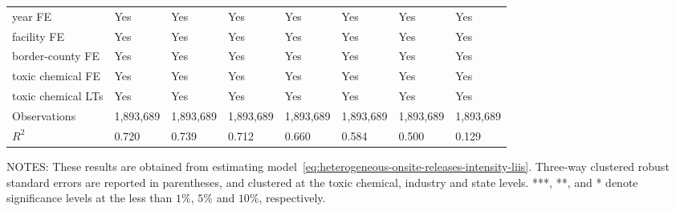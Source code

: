 \begin{table}[H]
{\begin{tabular}{@{}llllllll@{}}
            year FE                               & Yes       & Yes           & Yes       & Yes          & Yes             & Yes           & Yes                 \\
            facility FE                           & Yes       & Yes           & Yes       & Yes          & Yes             & Yes           & Yes                 \\
            border-county FE                      & Yes       & Yes           & Yes       & Yes          & Yes             & Yes           & Yes                 \\
            toxic chemical FE                     & Yes       & Yes           & Yes       & Yes          & Yes             & Yes           & Yes                 \\
            toxic chemical LTs                    & Yes       & Yes           & Yes       & Yes          & Yes             & Yes           & Yes                 \\ \midrule
            Observations                          & 1,893,689 & 1,893,689     & 1,893,689 & 1,893,689    & 1,893,689       & 1,893,689     & 1,893,689           \\
            $R^2$                                 & 0.720     & 0.739         & 0.712     & 0.660        & 0.584           & 0.500         & 0.129               \\ \bottomrule \bottomrule
        \end{tabular}%
    }
    \begin{minipage}{\columnwidth}
        \vspace{0.05in}
        \tiny NOTES: These results are obtained from estimating model~\ref{eq:heterogeneous-onsite-releases-intensity-liis}. Three-way clustered robust standard errors are reported in parentheses, and clustered at the toxic chemical, industry and state levels. ***, **, and * denote significance levels at the less than $1\%$, $5\%$ and $10\%$, respectively.
    \end{minipage}
\end{table}